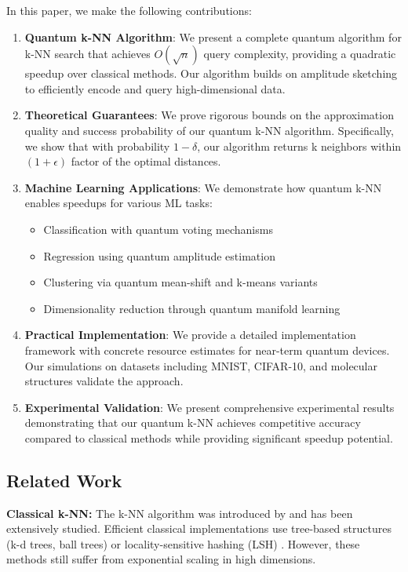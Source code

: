\documentclass[11pt]{article}
\begin{document}
In this paper, we make the following contributions:

\begin{enumerate}
\item \textbf{Quantum k-NN Algorithm}: We present a complete quantum algorithm for k-NN search that achieves $O(\sqrt{n})$ query complexity, providing a quadratic speedup over classical methods. Our algorithm builds on amplitude sketching to efficiently encode and query high-dimensional data.

\item \textbf{Theoretical Guarantees}: We prove rigorous bounds on the approximation quality and success probability of our quantum k-NN algorithm. Specifically, we show that with probability $1-\delta$, our algorithm returns k neighbors within $(1+\epsilon)$ factor of the optimal distances.

\item \textbf{Machine Learning Applications}: We demonstrate how quantum k-NN enables speedups for various ML tasks:
\begin{itemize}
    \item Classification with quantum voting mechanisms
    \item Regression using quantum amplitude estimation
    \item Clustering via quantum mean-shift and k-means variants
    \item Dimensionality reduction through quantum manifold learning
\end{itemize}

\item \textbf{Practical Implementation}: We provide a detailed implementation framework with concrete resource estimates for near-term quantum devices. Our simulations on datasets including MNIST, CIFAR-10, and molecular structures validate the approach.

\item \textbf{Experimental Validation}: We present comprehensive experimental results demonstrating that our quantum k-NN achieves competitive accuracy compared to classical methods while providing significant speedup potential.
\end{enumerate}

\subsection{Related Work}

\textbf{Classical k-NN:} The k-NN algorithm was introduced by \cite{cover1967nearest} and has been extensively studied. Efficient classical implementations use tree-based structures (k-d trees, ball trees) or locality-sensitive hashing (LSH) \cite{indyk1998approximate}. However, these methods still suffer from exponential scaling in high dimensions.
\end{document}
